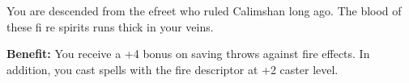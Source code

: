 
You are descended from the efreet who ruled Calimshan long ago. The blood of these fi re spirits runs thick in your veins.

\textbf{Benefit:} You receive a +4 bonus on saving throws against fire effects. In addition, you cast spells with the fire descriptor at +2 caster level.